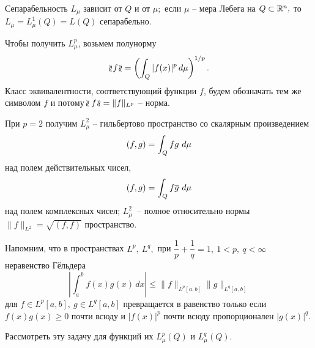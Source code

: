  Сепарабельность $L_{{\mu}}$ зависит от $Q$ и от $\mu;$ если $\mu$ --
 мера Лебега на $Q\subset\mathbb{R}^n,$ то $L_{\mu}=L_{\mu}^1(Q)=L(Q)$ сепарабельно.

 Чтобы получить $L^p_\mu$, возьмем полунорму
 $$
 \wr\!\!\wr\! f \!\wr\!\!\wr =\left( \int_Q |f(x)|^p\, d\mu \right)^{1/p}.
 $$
{ Класс эквивалентности, соответствующий функции $f$, будем обозначать тем же}
{символом $f$ и потому $\!\wr\!\!\wr f\!\wr\!\!\wr=\|f\|_{L^p}$ -- норма.}

 При $p=2$ получим {$L^2_\mu$} -- гильбертово пространство со скалярным
 произведением
 $$
 (f,g)=\displaystyle\int_Q {fg}\ d\mu
 $$
 над полем действительных чисел,
 $$
 (f,g)=\displaystyle\int_Q {f{\overline g}}\ d\mu
 $$
 над полем комплексных чисел; {$L^2_\mu$}~--
 полное относительно нормы $\|f\|_{{L^2}}=\sqrt{(f,f)}$ {пространство}.

 Напомним, что в пространствах $L^p,\ L^q,$ при $\dfrac{1}{p}+\dfrac{1}{q}=1,\ 1<p,\ q<\infty$
 неравенство Г\"{е}льдера
 $$
 \left| \int_{a}^b f(x)g(x)\,dx\right| \le
 \|f\|_{L^p[a,b]}\|g\|_{L^q[a,b]}
 $$
 для $f\in L^p[a,b],\ g\in L^q[a,b]$ превращается в
 равенство только если $f(x)g(x)\ge 0$ почти всюду и
 $|f(x)|^p$ почти всюду пропорционален $|g(x)|^{q}.$

 \begin{ex}
Рассмотреть эту задачу для функций их $L^p_{\mu}(Q)$ и $L^q_{\mu}(Q).$
 \end{ex}
